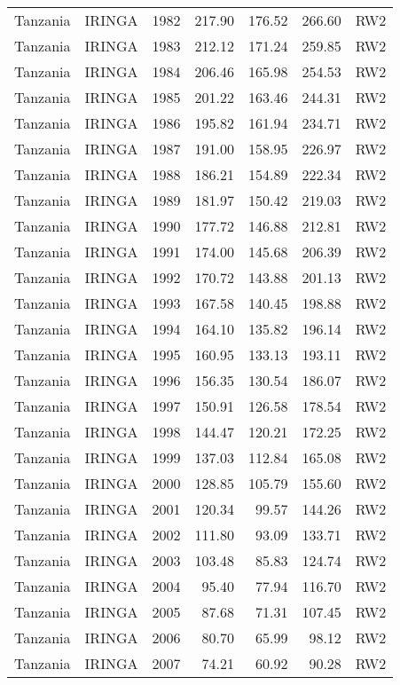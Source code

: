\begin{longtable}{lllrrrl}
  Tanzania & IRINGA & 1982 & 217.90 & 176.52 & 266.60 & RW2 \\ 
  Tanzania & IRINGA & 1983 & 212.12 & 171.24 & 259.85 & RW2 \\ 
  Tanzania & IRINGA & 1984 & 206.46 & 165.98 & 254.53 & RW2 \\ 
  Tanzania & IRINGA & 1985 & 201.22 & 163.46 & 244.31 & RW2 \\ 
  Tanzania & IRINGA & 1986 & 195.82 & 161.94 & 234.71 & RW2 \\ 
  Tanzania & IRINGA & 1987 & 191.00 & 158.95 & 226.97 & RW2 \\ 
  Tanzania & IRINGA & 1988 & 186.21 & 154.89 & 222.34 & RW2 \\ 
  Tanzania & IRINGA & 1989 & 181.97 & 150.42 & 219.03 & RW2 \\ 
  Tanzania & IRINGA & 1990 & 177.72 & 146.88 & 212.81 & RW2 \\ 
  Tanzania & IRINGA & 1991 & 174.00 & 145.68 & 206.39 & RW2 \\ 
  Tanzania & IRINGA & 1992 & 170.72 & 143.88 & 201.13 & RW2 \\ 
  Tanzania & IRINGA & 1993 & 167.58 & 140.45 & 198.88 & RW2 \\ 
  Tanzania & IRINGA & 1994 & 164.10 & 135.82 & 196.14 & RW2 \\ 
  Tanzania & IRINGA & 1995 & 160.95 & 133.13 & 193.11 & RW2 \\ 
  Tanzania & IRINGA & 1996 & 156.35 & 130.54 & 186.07 & RW2 \\ 
  Tanzania & IRINGA & 1997 & 150.91 & 126.58 & 178.54 & RW2 \\ 
  Tanzania & IRINGA & 1998 & 144.47 & 120.21 & 172.25 & RW2 \\ 
  Tanzania & IRINGA & 1999 & 137.03 & 112.84 & 165.08 & RW2 \\ 
  Tanzania & IRINGA & 2000 & 128.85 & 105.79 & 155.60 & RW2 \\ 
  Tanzania & IRINGA & 2001 & 120.34 & 99.57 & 144.26 & RW2 \\ 
  Tanzania & IRINGA & 2002 & 111.80 & 93.09 & 133.71 & RW2 \\ 
  Tanzania & IRINGA & 2003 & 103.48 & 85.83 & 124.74 & RW2 \\ 
  Tanzania & IRINGA & 2004 & 95.40 & 77.94 & 116.70 & RW2 \\ 
  Tanzania & IRINGA & 2005 & 87.68 & 71.31 & 107.45 & RW2 \\ 
  Tanzania & IRINGA & 2006 & 80.70 & 65.99 & 98.12 & RW2 \\ 
  Tanzania & IRINGA & 2007 & 74.21 & 60.92 & 90.28 & RW2 \\ 

\end{longtable}
